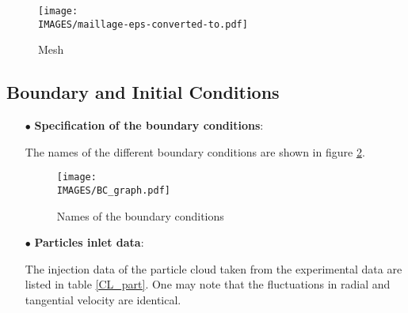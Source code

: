 \begin{figure}[H]
   \centerline{\texttt{[image: \\IMAGES/maillage-eps-converted-to.pdf]}}
   \caption{\label{maillage}{Mesh}}
\end{figure}

\subsection{Boundary and Initial Conditions}

\begin{itemize}

\item[$\bullet$] \textbf{Specification of the boundary conditions}:

The names of the different boundary conditions are shown in figure \ref{couleur}.

\begin{figure}[H]
   \centerline{\texttt{[image: \\IMAGES/BC\_graph.pdf]}}
   \caption{\label{couleur}{Names of the boundary conditions}}
\end{figure}

\item[$\bullet$] \textbf{Particles inlet data}:

The injection data of the particle cloud taken from the experimental data are listed in table \ref{CL_part}. One may note that the fluctuations in radial and tangential velocity are identical.


\end{itemize}
